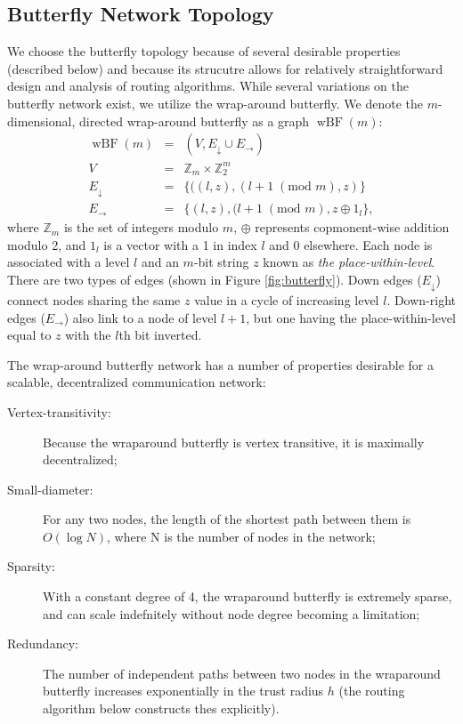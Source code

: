 \documentclass{sig-alternate-05-2015}
\newcommand{\beq}{\begin{eqnarray}}
\newcommand{\eeq}{\end{eqnarray}}
\DeclareMathOperator{\wbf}{wBF}
\begin{document}
\subsection{Butterfly Network Topology}

We choose the butterfly topology
\cite{kshemkalyani_distributed_2008}
because of several desirable properties (described below)
and because its strucutre allows for relatively straightforward
design and analysis of routing algorithms.
While several variations on the butterfly network exist,
we utilize the wrap-around butterfly.
We denote the $m$-dimensional, directed wrap-around butterfly as a
graph $\wbf(m)$:
\beq
\wbf(m) &=& (V, E_\downarrow \cup E_\rightarrow) \\
V &=& \mathbb{Z}_{m} \times \mathbb{Z}_2^m \\
E_\downarrow
&=&
\{((l,z),(l+1 \; (\text{mod } m),z) \} \\
E_\rightarrow
&=&
\{(l,z),(l+1 \; (\text{mod } m),
z \oplus 1_l \},
\eeq
where $\mathbb{Z}_m$ is the set of integers modulo $m$,
$\oplus$ represents copmonent-wise addition modulo 2,
and $1_l$ is a vector with a 1 in index $l$ and 0 elsewhere.
Each node is associated with a level $l$ and an $m$-bit string $z$
known as {\em the place-within-level}.
There are two types of edges (shown in Figure \ref{fig:butterfly}).
Down edges ($E_\downarrow$) connect nodes sharing the same $z$ value
in a cycle of increasing level $l$.
Down-right edges ($E_\rightarrow$) also link to a node of level $l + 1$,
but one having the place-within-level equal to $z$ with the $l$th bit inverted.

The wrap-around butterfly network has a number of properties desirable for
a scalable, decentralized communication network:
\begin{description}
\item[Vertex-transitivity:]
Because the wraparound butterfly is vertex transitive,
it is maximally decentralized;
\item[Small-diameter:]
For any two nodes, the length of the shortest path between them is
$O(\log N)$, where N is the number of nodes in the network;
\item[Sparsity:]
With a constant degree of 4, the wraparound butterfly is extremely sparse,
and can scale indefnitely without node degree becoming a limitation;
\item [Redundancy:]
The number of independent paths between two
nodes in the wraparound butterfly increases exponentially in the trust
radius $h$ (the routing algorithm below constructs thes explicitly).
\end{description}
\end{document}
